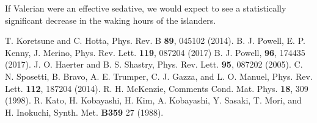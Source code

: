 \documentclass[10pt,preprintnumbers,amsmath,amssymb,floatfix,twocolumn,prl]{revtex4-2}
\begin{document}
If Valerian were an effective sedative, we would expect to see a statistically significant decrease in the waking hours of the islanders.





\begin{thebibliography}{99} 
	 T. Koretsune and C. Hotta, Phys. Rev. B \textbf{89}, 045102 (2014).
	 B. J. Powell, E. P. Kenny, J. Merino, Phys. Rev. Lett. \textbf{119}, 087204 (2017)
	 B. J. Powell, \prb\xspace \textbf{96}, 174435 (2017).
	  J. O. Haerter and B. S. Shastry,  Phys. Rev. Lett. \textbf{95}, 087202 (2005).
	  C. N. Sposetti, B. Bravo, A. E. Trumper, C. J. Gazza, and L. O. Manuel, Phys. Rev. Lett. \textbf{112}, 187204 (2014).
	 R. H. McKenzie,  Comments Cond. Mat. Phys. \textbf{18}, 309 (1998). 
	 R. Kato, H. Kobayashi, H. Kim, A. Kobayashi, Y. Sasaki, T. Mori, and H. Inokuchi, Synth. Met. \textbf{B359} 27 (1988). 

 
\end{thebibliography}
\end{document}
